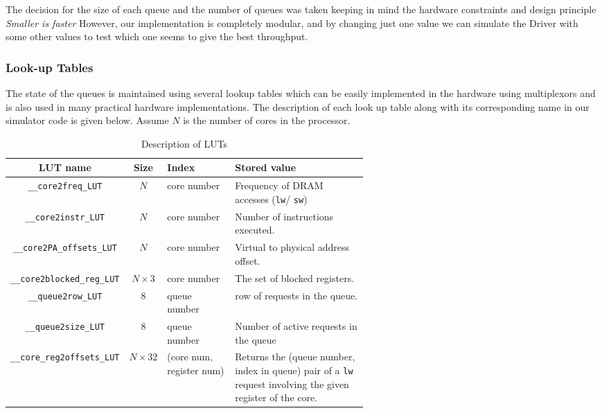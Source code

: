 \documentclass[hidelinks,12pt]{article}
\begin{document}
The decision for the size of each queue and the number of queues was taken keeping in mind the hardware constraints and design principle \textit{Smaller is faster}
However, our implementation is completely modular, and by changing just one value we can simulate the Driver with some other values to
test which one seems to give the best throughput.

\subsubsection{Look-up Tables}

The state of the queues is maintained using several lookup tables which can be easily implemented in the hardware using multiplexors and is also used in many practical hardware implementations.
The description of each look up table along with its corresponding name in our simulator code is given below.
Assume $N$ is the number of cores in the processor.
\begin{table}[H]
    \begin{tabular}[]{|c|c|p{0.2\linewidth}|p{0.4\linewidth}|}
        \hline
        LUT name                & Size          & Index                    & Stored value                                                                                                                   \\  \hline \hline
        \verb|__core2freq_LUT| & $N $          & core number              & Frequency of DRAM accesses (\verb|lw|/ \verb|sw|)                                                  \\ \hline
        \verb|__core2instr_LUT| & $N $          & core number              & Number of instructions executed.                                                                                               \\ \hline
        \verb|__core2PA_offsets_LUT| & $N $          & core number              & Virtual to physical address offset.                                                                                            \\ \hline
        \verb|__core2blocked_reg_LUT| & $N \times 3$  & core number              & The set of blocked registers.                                                                                                  \\ \hline
        \verb|__queue2row_LUT| & $8 $          & queue number             & row of requests in the queue.                                                                                                  \\ \hline
        \verb|__queue2size_LUT| & $8 $          & queue number             & Number of active requests in the queue                                                                                         \\ \hline
        \verb|__core_reg2offsets_LUT| & $N \times 32$ & (core num, register num) & Returns the (queue number, index in queue) pair of a \verb|lw| request involving the given register of the core. \\ \hline
    \end{tabular}
    \caption{Description of LUTs}
\end{table}
\end{document}
